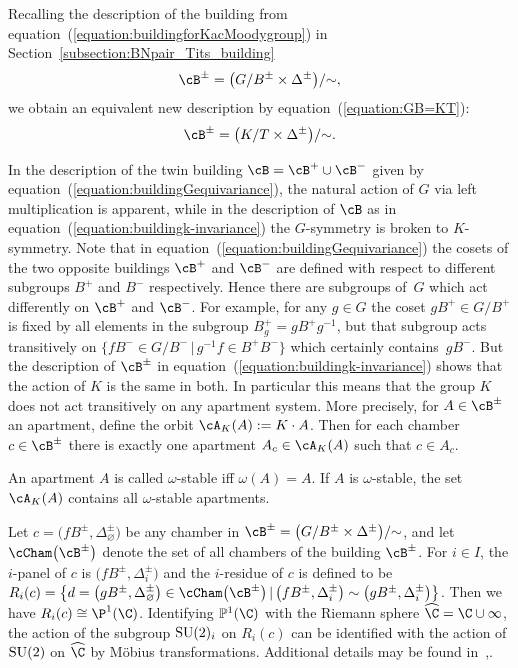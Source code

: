 Recalling the description of the building from equation~(\ref{equation:buildingforKacMoodygroup}) in Section~\ref{subsection:BNpair_Tits_building}
\begin{gather}\label{equation:buildingGequivariance}
\cB^{\pm}=\big(G/B^{\pm}\times \Delta^{\pm}\big)/{\sim},
\end{gather}
we obtain an equivalent new description by equation~(\ref{equation:GB=KT}):
\begin{gather}\label{equation:buildingk-invariance}
\cB^{\pm}=\big(K/T\times \Delta^{\pm}\big)/{\sim}.
\end{gather}

In the description of the twin building $\cB=\cB^+\cup \cB^-$ given by equation~(\ref{equation:buildingGequivariance}), the natural action of $G$ via left multiplication is apparent, while in the description of $\cB$ as in equation~(\ref{equation:buildingk-invariance}) the $G$-symmetry is broken to $K$-symmetry. Note that in equation~(\ref{equation:buildingGequivariance}) the cosets of the two opposite buildings $\cB^+$ and $\cB^-$ are defined with respect to different subgroups $B^+$ and $B^-$ respectively. Hence there are subgroups of~$G$ which act differently on $\cB^+$ and $\cB^-$. For example, for any $g\in G$ the coset $gB^+\in G/B^+$ is fixed by all elements in the subgroup
$B^+_g=gB^+g^{-1}$, but that subgroup acts transitively on $\big\{fB^-\in G/B^-\, |\, g^{-1}f\in B^+B^-\big\}$ which certainly contains~$gB^-$. But the description of $\cB^\pm$ in equation~(\ref{equation:buildingk-invariance}) shows that the action of $K$ is the same in both. In particular this means that the group $K$ does not act transitively on any apartment system. More precisely, for $A\in\cB^\pm$ an apartment, define the orbit $\cA_K(A) := K\cdot A$. Then for each chamber $c\in\cB^\pm$ there is exactly one apartment $A_c\in \cA_K(A)$ such that $c\in A_c$.

An apartment $A$ is called $\omega$-stable iff $\omega(A)=A$. If $A$ is $\omega$-stable, the set $\cA_K(A)$ contains all $\omega$-stable apartments.

Let $c = \big(fB^\pm, \Delta_\varnothing^\pm\big)$ be any chamber in $\cB^\pm=\big(G/B^\pm\times \Delta^\pm\big)/{\sim}$, and let $\cCham\big(\cB^\pm\big)$ denote the set of all chambers of the building $\cB^\pm$.
For $i\in I$, the $i$-panel of $c$ is $\big(fB^\pm, \Delta_i^\pm\big)$ and the $i$-residue of $c$ is defined to be
$R_i(c)=\big\{d = \big(gB^\pm, \Delta_\varnothing^\pm\big)\in\cCham\big(\cB^\pm\big)\, |\, \big(fB^\pm, \Delta_i^\pm\big) \sim \big(gB^\pm, \Delta_i^\pm\big) \big\}$. Then we have $R_i(c)\cong \P^1(\C)$. Identifying $\mathbb{P}^1(\C)$ with the Riemann sphere $\widehat{\C}=\C\cup \infty$, the action of the subgroup ${\rm SU}(2)_i$ on $R_i(c)$ can be identified with the action of ${\rm SU}(2)$ on $\widehat{\C}$ by M\"obius transformations. Additional details may be found in~\cite[Chapter~6]{AbramenkoBrown08},.


